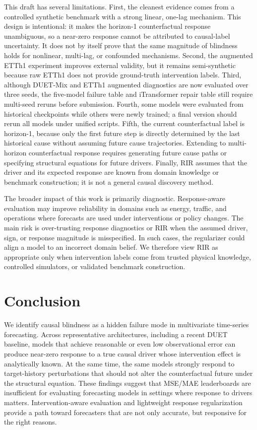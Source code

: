 \documentclass{article}
\begin{document}
This draft has several limitations. First, the cleanest evidence comes from a
controlled synthetic benchmark with a strong linear, one-lag mechanism. This design
is intentional: it makes the horizon-1 counterfactual response unambiguous, so a
near-zero response cannot be attributed to causal-label uncertainty. It does not by
itself prove that the same magnitude of blindness holds for nonlinear, multi-lag, or
confounded mechanisms. Second, the augmented ETTh1 experiment improves external
validity, but it remains semi-synthetic because raw ETTh1 does not provide
ground-truth intervention labels. Third, although DUET-Mix and ETTh1 augmented
diagnostics are now evaluated over three seeds, the five-model failure table and
iTransformer repair table still require multi-seed reruns before submission. Fourth,
some models were evaluated from historical checkpoints while others were newly
trained; a final version should rerun all models under unified scripts. Fifth, the
current counterfactual label is horizon-1, because only the first future step is
directly determined by the last historical cause without assuming future cause
trajectories. Extending to multi-horizon counterfactual response requires generating
future cause paths or specifying structural equations for future drivers. Finally,
RIR assumes that the driver and its expected response are known from domain knowledge
or benchmark construction; it is not a general causal discovery method.

The broader impact of this work is primarily diagnostic. Response-aware evaluation
may improve reliability in domains such as energy, traffic, and operations where
forecasts are used under interventions or policy changes. The main risk is
over-trusting response diagnostics or RIR when the assumed driver, sign, or response
magnitude is misspecified. In such cases, the regularizer could align a model to an
incorrect domain belief. We therefore view RIR as appropriate only when intervention
labels come from trusted physical knowledge, controlled simulators, or validated
benchmark construction.

\section{Conclusion}

We identify causal blindness as a hidden failure mode in multivariate time-series
forecasting. Across representative architectures, including a recent DUET baseline,
models that achieve reasonable or even low observational error can produce near-zero response to a true causal driver
whose intervention effect is analytically known. At the same time, the same models
strongly respond to target-history perturbations that should not alter the counterfactual
future under the structural equation. These findings suggest that MSE/MAE leaderboards
are insufficient for evaluating forecasting models in settings where response to drivers
matters. Intervention-aware evaluation and lightweight response regularization provide
a path toward forecasters that are not only accurate, but responsive for the right reasons.
\end{document}
